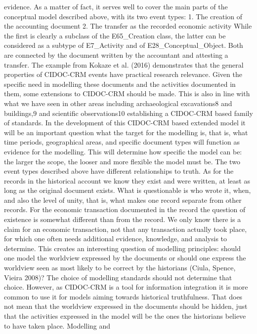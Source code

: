 \documentclass[12pt,a4paper]{article}
\begin{document}
evidence. As a matter of fact, it serves well to cover the main parts of the conceptual model
described above, with its two event types:
1. The creation of the accounting document
2. The transfer as the recorded economic activity
While the first is clearly a subclass of the E65\_Creation class, the latter can be considered as a
subtype of E7\_Activity and of E28\_Conceptual\_Object.
 Both are connected by the document
written by the accountant and attesting a transfer. The example from Kokaze et al. (2016)
demonstrates that the general properties of CIDOC-CRM events have practical research
relevance.
Given the specific need in modelling these documents and the activities documented in them,
some extensions to CIDOC-CRM should be made. This is also in line with what we have seen in
other areas including archaeological excavations8 and buildings,9 and scientific observations10
establishing a CIDOC-CRM based family of standards. In the development of this CIDOC-CRM
based extended model it will be an important question what the target for the modelling is, that
is, what time periods, geographical areas, and specific document types will function as evidence
for the modelling. This will determine how specific the model can be: the larger the scope, the
looser and more flexible the model must be.
The two event types described above have different relationships to truth. As for the records in
the historical account we know they exist and were written, at least as long as the original
document exists. What is questionable is who wrote it, when, and also the level of unity, that is,
what makes one record separate from other records. For the economic transaction documented in
the record the question of existence is somewhat different than from the record. We only know
there is a claim for an economic transaction, not that any transaction actually took place, for
which one often needs additional evidence, knowledge, and analysis to determine.
This creates an interesting question of modelling principles: should one model the worldview
expressed by the documents or should one express the worldview seen as most likely to be
correct by the historians (Ciula, Spence, Vieira 2008)? The choice of modelling standards should
not determine that choice. However, as CIDOC-CRM is a tool for information integration it is
more common to use it for models aiming towards historical truthfulness. That does not mean
that the worldview expressed in the documents should be hidden, just that the activities
expressed in the model will be the ones the historians believe to have taken place. Modelling and
\end{document}
